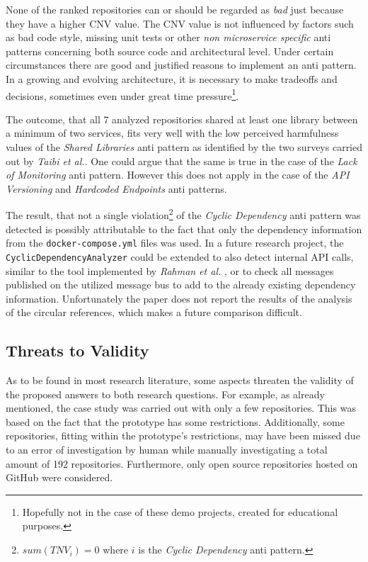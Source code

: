 \documentclass{article}
\begin{document}
None of the ranked repositories can or should be regarded as \textit{bad} just because they have a higher CNV value.
The CNV value is not influenced by factors such as bad code style, missing unit tests or other \textit{non microservice specific} anti patterns concerning both source code and architectural level.
Under certain circumstances there are good and justified reasons to implement an anti pattern.
In a growing and evolving architecture, it is necessary to make tradeoffs and decisions, sometimes even under great time pressure\footnote{Hopefully not in the case of these demo projects, created for educational purposes.}. \newline

The outcome, that all 7 analyzed repositories shared at least one library between a minimum of two services, fits very well with the low perceived harmfulness values of the \textit{Shared Libraries} anti pattern as identified by the two surveys \cite{taibi_definition_2018, taibi_microservices_2020} carried out by \textit{Taibi et al.}.
One could argue that the same is true in the case of the \textit{Lack of Monitoring} anti pattern.
However this does not apply in the case of the \textit{API Versioning} and \textit{Hardcoded Endpoints} anti patterns. \newline

The result, that not a single violation\footnote{$sum(TNV_i) = 0$ where $i$ is the \textit{Cyclic Dependency} anti pattern.} of the \textit{Cyclic Dependency} anti pattern was detected is possibly attributable to the fact that only the dependency information from the \lstinline{docker-compose.yml} files was used.
In a future research project, the \lstinline{CyclicDependencyAnalyzer} could be extended to also detect internal API calls, similar to the tool implemented by \textit{Rahman et al.} \cite{imranur_curated_2019}, or to check all messages published on the utilized message bus to add to the already existing dependency information.
Unfortunately the paper \cite{imranur_curated_2019} does not report the results of the analysis of the circular references, which makes a future comparison difficult.

\subsection{Threats to Validity}
As to be found in most research literature, some aspects threaten the validity of the proposed answers to both research questions.
For example, as already mentioned, the case study was carried out with only a few repositories.
This was based on the fact that the prototype has some restrictions.
Additionally, some repositories, fitting within the prototype's restrictions, may have been missed due to an error of investigation by human while manually investigating a total amount of 192 repositories.
Furthermore, only open source repositories hosted on GitHub were considered. \newline
\end{document}
